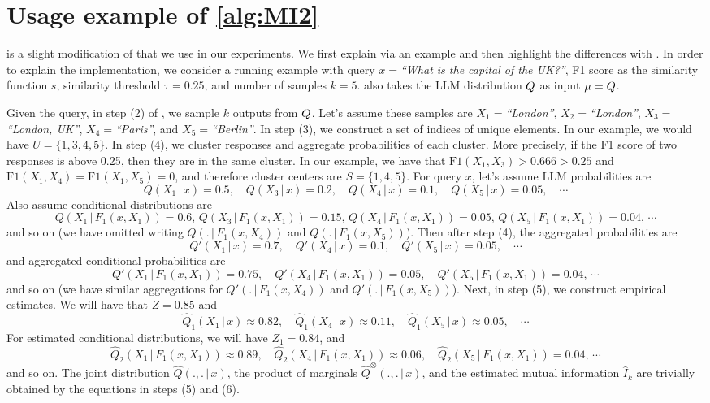 \section{Usage example of \cref{alg:MI2}}
\label{app:alg-MI2}

 is a slight modification of  that we use in our experiments. We first explain  via an example and then highlight the differences with . In order to explain the implementation, we consider a running example with query $x=$\textit{``What is the capital of the UK?''}, F1 score as the similarity function $s$, similarity threshold $\tau=0.25$, and number of samples $k=5$.  also takes the LLM distribution $Q$ as input $\mu=Q$.  

Given the query, in step (2) of , we  sample $k$ outputs from $Q$. Let's assume these samples are $X_1=$\textit{``London''}, $X_2=$\textit{``London''}, $X_3=$\textit{``London, UK''}, $X_4=$\textit{``Paris''}, and $X_5=$\textit{``Berlin''}. In step (3), we construct a set of indices of unique elements. In our example, we would have $U=\{1,3,4,5\}$. In step (4), we cluster responses and aggregate probabilities of each cluster. More precisely, if the F1 score of two responses is above 0.25, then they are in the same cluster. In our example, we have that $\text{F1}(X_1,X_3) > 0.666 > 0.25$ and $\text{F1}(X_1,X_4)=\text{F1}(X_1,X_5)=0$, and therefore cluster centers are $S=\{1,4,5\}$. For query $x$, let's assume LLM probabilities are
\[
    Q(X_1\,|\, x) = 0.5,\quad Q(X_3\,|\, x) = 0.2,\quad Q(X_4\,|\, x) = 0.1,\quad Q(X_5\,|\, x) = 0.05, \quad \cdots
\]
Also assume conditional distributions are 
\[
    Q(X_1\,|\, F_1(x,X_1)) = 0.6,\, Q(X_3\,|\, F_1(x,X_1)) = 0.15,\, Q(X_4\,|\, F_1(x,X_1)) = 0.05,\, Q(X_5\,|\, F_1(x,X_1)) = 0.04, \, \cdots
\]
and so on (we have omitted writing $Q(.\,|\, F_1(x,X_4))$ and $Q(.\,|\, F_1(x,X_5))$). Then after step (4), the aggregated probabilities are 
\[
    Q'(X_1\,|\, x) = 0.7,\quad Q'(X_4\,|\, x) = 0.1,\quad Q'(X_5\,|\, x) = 0.05, \quad \cdots
\]
and aggregated conditional probabilities are
\[
    Q'(X_1\,|\, F_1(x,X_1)) = 0.75,\quad Q'(X_4\,|\, F_1(x,X_1)) = 0.05,\quad Q'(X_5\,|\, F_1(x,X_1)) = 0.04, \, \cdots
\]
and so on (we have similar aggregations for $Q'(.\,|\, F_1(x,X_4))$ and $Q'(.\,|\, F_1(x,X_5))$). Next, in step (5), we construct empirical estimates. We will have that $Z=0.85$ and     
\[
    \widehat Q_1(X_1\,|\, x) \approx 0.82,\quad \widehat Q_1(X_4\,|\, x) \approx 0.11,\quad \widehat Q_1(X_5\,|\, x) \approx 0.05, \quad \cdots
\]
For estimated conditional distributions, we will have $Z_1=0.84$, and
\[
    \widehat Q_2(X_1\,|\, F_1(x,X_1)) \approx 0.89,\quad \widehat Q_2(X_4\,|\, F_1(x,X_1)) \approx 0.06,\quad \widehat Q_2(X_5\,|\, F_1(x,X_1)) = 0.04, \, \cdots
\]
and so on. The joint distribution $\widehat Q(.,.\,|\,x)$, the product of marginals $\widehat Q^\otimes(.,.\,|\,x)$, and the estimated mutual information $\widehat I_k$ are trivially obtained by the equations in steps (5) and (6).  

